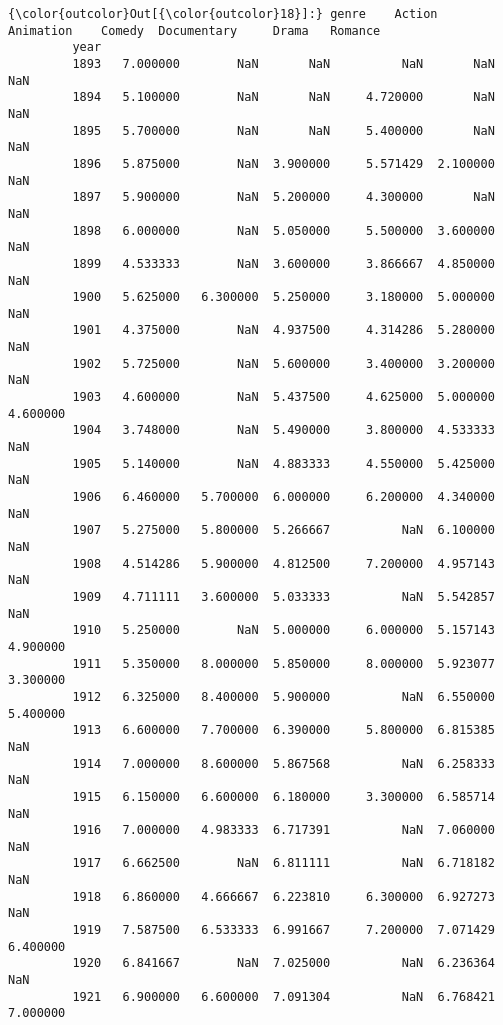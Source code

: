 \documentclass[11pt]{article}
\begin{document}
\begin{Verbatim}[commandchars=\\\{\}]
{\color{outcolor}Out[{\color{outcolor}18}]:} genre    Action  Animation    Comedy  Documentary     Drama   Romance
         year                                                                 
         1893   7.000000        NaN       NaN          NaN       NaN       NaN
         1894   5.100000        NaN       NaN     4.720000       NaN       NaN
         1895   5.700000        NaN       NaN     5.400000       NaN       NaN
         1896   5.875000        NaN  3.900000     5.571429  2.100000       NaN
         1897   5.900000        NaN  5.200000     4.300000       NaN       NaN
         1898   6.000000        NaN  5.050000     5.500000  3.600000       NaN
         1899   4.533333        NaN  3.600000     3.866667  4.850000       NaN
         1900   5.625000   6.300000  5.250000     3.180000  5.000000       NaN
         1901   4.375000        NaN  4.937500     4.314286  5.280000       NaN
         1902   5.725000        NaN  5.600000     3.400000  3.200000       NaN
         1903   4.600000        NaN  5.437500     4.625000  5.000000  4.600000
         1904   3.748000        NaN  5.490000     3.800000  4.533333       NaN
         1905   5.140000        NaN  4.883333     4.550000  5.425000       NaN
         1906   6.460000   5.700000  6.000000     6.200000  4.340000       NaN
         1907   5.275000   5.800000  5.266667          NaN  6.100000       NaN
         1908   4.514286   5.900000  4.812500     7.200000  4.957143       NaN
         1909   4.711111   3.600000  5.033333          NaN  5.542857       NaN
         1910   5.250000        NaN  5.000000     6.000000  5.157143  4.900000
         1911   5.350000   8.000000  5.850000     8.000000  5.923077  3.300000
         1912   6.325000   8.400000  5.900000          NaN  6.550000  5.400000
         1913   6.600000   7.700000  6.390000     5.800000  6.815385       NaN
         1914   7.000000   8.600000  5.867568          NaN  6.258333       NaN
         1915   6.150000   6.600000  6.180000     3.300000  6.585714       NaN
         1916   7.000000   4.983333  6.717391          NaN  7.060000       NaN
         1917   6.662500        NaN  6.811111          NaN  6.718182       NaN
         1918   6.860000   4.666667  6.223810     6.300000  6.927273       NaN
         1919   7.587500   6.533333  6.991667     7.200000  7.071429  6.400000
         1920   6.841667        NaN  7.025000          NaN  6.236364       NaN
         1921   6.900000   6.600000  7.091304          NaN  6.768421  7.000000

\end{Verbatim}
\end{document}
